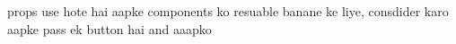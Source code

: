 props use hote hai aapke components ko resuable banane ke liye, consdider karo aapke pass ek button hai and aaapko  